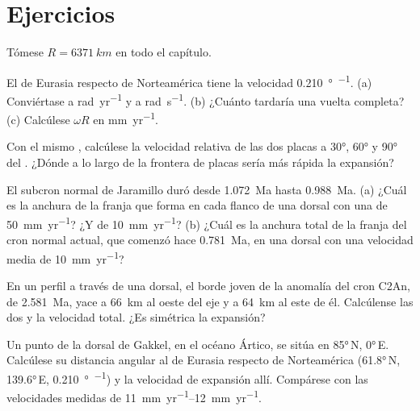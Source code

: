 \section{Ejercicios}

Tómese $R = \qty{6371}{km}$ en todo el capítulo.

\begin{exercise}[$\star$]\label{exo:b1:plate-kinematics:1}
El  de Eurasia respecto de Norteamérica tiene la velocidad \qty{0.210}{\degree\per\Myr}. (a) Conviértase a
\unit{rad.yr^{-1}} y a \unit{rad.s^{-1}}. (b) ¿Cuánto tardaría una vuelta completa? (c) Calcúlese $\omega R$ en \unit{mm.yr^{-1}}.
\end{exercise}

\begin{exercise}[$\star$]\label{exo:b1:plate-kinematics:2}
Con el mismo , calcúlese la velocidad relativa de las dos placas a \ang{30}, \ang{60} y \ang{90} del .
¿Dónde a lo largo de la frontera de placas sería más rápida la expansión?
\end{exercise}

\begin{exercise}[$\star$]\label{exo:b1:plate-kinematics:3}
El subcron normal de Jaramillo duró desde \qty{1.072}{Ma} hasta \qty{0.988}{Ma}. (a) ¿Cuál es la anchura de la franja que forma en cada
flanco de una dorsal con una  de \qty{50}{mm.yr^{-1}}? ¿Y de \qty{10}{mm.yr^{-1}}? (b) ¿Cuál es la anchura
total de la franja del cron normal actual, que comenzó hace \qty{0.781}{Ma}, en una dorsal con una velocidad media de
\qty{10}{mm.yr^{-1}}?
\end{exercise}

\begin{exercise}[$\star$]\label{exo:b1:plate-kinematics:4}
En un perfil a través de una dorsal, el borde joven de la anomalía del cron C2An, de \qty{2.581}{Ma}, yace a \qty{66}{km} al oeste del eje
y a \qty{64}{km} al este de él. Calcúlense las dos  y la velocidad total. ¿Es simétrica la expansión?
\end{exercise}

\begin{exercise}[$\star\star$]\label{exo:b1:plate-kinematics:5}
Un punto de la dorsal de Gakkel, en el océano Ártico, se sitúa en \ang{85}\,N, \ang{0}\,E. Calcúlese su distancia angular al  de Eurasia respecto de Norteamérica (\ang{61.8}\,N, \ang{139.6}\,E, \qty{0.210}{\degree\per\Myr}) y la velocidad de expansión
allí. Compárese con las velocidades medidas de \qtyrange{11}{12}{mm.yr^{-1}}.
\end{exercise}

